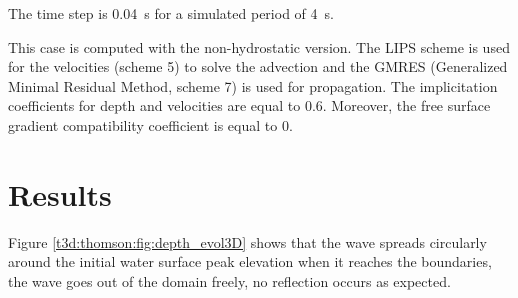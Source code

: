 \bigskip
The time step is 0.04~s for a simulated period of 4~s. 

\bigskip
This case is computed with the non-hydrostatic version. The LIPS scheme 
is used for the velocities (scheme 5) to solve the advection and the GMRES 
(Generalized Minimal Residual Method, scheme 7) is used for propagation. 
The implicitation coefficients for depth and velocities are equal to 0.6.
Moreover, the free surface gradient compatibility coefficient is equal to 0.

\section{Results}

\bigskip
Figure \ref{t3d:thomson:fig:depth_evol3D}
shows that the wave spreads circularly around the initial water 
surface peak elevation when it reaches the boundaries,
the wave goes out of the domain freely, no reflection occurs as expected.


